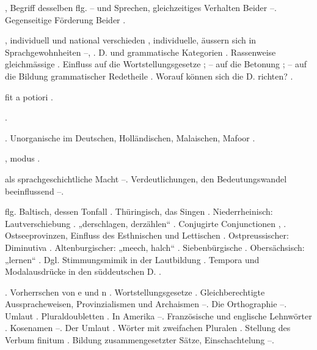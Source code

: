 \begin{register}
, Begriff desselben \pageref{sp.6} flg. – und Sprechen, gleichzeitiges Verhalten Beider \pageref{sp.43}–\pageref{sp.44}. Gegenseitige Förderung Beider \pageref{sp.312}. 

, individuell und national verschieden \pageref{sp.44}, individuelle, äussern sich in Sprachgewohnheiten \pageref{sp.98}–\pageref{sp.99}, \pageref{sp.150}. D. und grammatische Kategorien \pageref{sp.253}. Rassenweise gleichmässige \pageref{sp.293}. Einfluss auf die Wortstellungsgesetze \pageref{sp.372}; – auf die Betonung \pageref{sp.376}; – auf die Bildung grammatischer Redetheile \pageref{sp.382}. Worauf können sich die D. richten? \pageref{sp.428}.



 fit a potiori \pageref{sp.56}.

 \pageref{sp.102}.

 \pageref{sp.36}. Unorganische im Deutschen, Holländischen, Malaischen, Mafoor \pageref{sp.201}.

, modus \pageref{sp.114}.

 als sprachgeschichtliche Macht \pageref{sp.181}–\pageref{sp.185}. Verdeutlichungen, den Bedeutungswandel beeinflussend \pageref{sp.239}–\pageref{sp.243}.

 \pageref{sp.284} flg. Baltisch, dessen Tonfall \pageref{sp.34}. Thüringisch, das Singen \pageref{sp.34}. Niederrheinisch: Lautverschiebung \pageref{sp.189}. „derschlagen, derzählen“ \pageref{sp.201}. Conjugirte Conjunctionen \pageref{sp.214}, \pageref{sp.398}. Ostseeprovinzen, Einfluss des Esthnischen und Lettischen \pageref{sp.269}. Ostpreussischer: Diminutiva \pageref{sp.218}. Altenburgischer: „meech, halch“ \pageref{sp.284}. Siebenbürgische \pageref{sp.286}. Obersächsisch: „lernen“ \pageref{sp.316}. Dgl. Stimmungsmimik in der Lautbildung \pageref{sp.378}. Tempora und Modalausdrücke in den süddeutschen D. \pageref{sp.431}.

. Vorherrschen von e und n \pageref{sp.34}. Wortstellungsgesetze \pageref{sp.63}. Gleichberechtigte Ausspracheweisen, Provinzialismen und Archaismen \pageref{sp.125}–\pageref{sp.127}. Die Orthographie \pageref{sp.132}–\pageref{sp.133}. Umlaut \pageref{sp.199}. Pluraldoubletten \pageref{sp.254}. In Amerika \pageref{sp.261}–\pageref{sp.262}. Französische und englische Lehnwörter \pageref{sp.264}. Kosenamen \pageref{sp.277}–\pageref{sp.278}. Der Umlaut \pageref{sp.401}. Wörter mit zweifachen Pluralen \pageref{sp.444}. Stellung des Verbum finitum \pageref{sp.429}. Bildung zusammengesetzter Sätze, Einschachtelung \pageref{sp.467}–\pageref{sp.469}.


\end{register}
